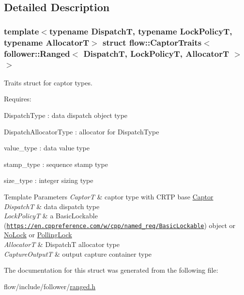 \subsection{Detailed Description}
\subsubsection*{template$<$typename DispatchT, typename Lock\+PolicyT, typename AllocatorT$>$\newline
struct flow\+::\+Captor\+Traits$<$ follower\+::\+Ranged$<$ Dispatch\+T, Lock\+Policy\+T, Allocator\+T $>$ $>$}

Traits struct for captor types. 

Requires\+:
\begin{DoxyItemize}
\item {\ttfamily Dispatch\+Type} \+: data dispatch object type
\item {\ttfamily Dispatch\+Allocator\+Type} \+: allocator for {\ttfamily Dispatch\+Type}
\item {\ttfamily value\+\_\+type} \+: data value type
\item {\ttfamily stamp\+\_\+type} \+: sequence stamp type
\item {\ttfamily size\+\_\+type} \+: integer sizing type
\end{DoxyItemize}


\begin{DoxyTemplParams}{Template Parameters}
{\em CaptorT} & captor type with C\+R\+TP base {\ttfamily \hyperlink{classflow_1_1_captor}{Captor}}\\
\hline
{\em DispatchT} & data dispatch type \\
\hline
{\em Lock\+PolicyT} & a Basic\+Lockable (\href{https://en.cppreference.com/w/cpp/named_req/BasicLockable}{\tt https\+://en.\+cppreference.\+com/w/cpp/named\+\_\+req/\+Basic\+Lockable}) object or \hyperlink{structflow_1_1_no_lock}{No\+Lock} or \hyperlink{structflow_1_1_polling_lock}{Polling\+Lock} \\
\hline
{\em AllocatorT} & {\ttfamily DispatchT} allocator type \\
\hline
{\em Capture\+OutputT} & output capture container type \\
\hline
\end{DoxyTemplParams}


The documentation for this struct was generated from the following file\+:\begin{DoxyCompactItemize}
\item 
flow/include/follower/\hyperlink{ranged_8h}{ranged.\+h}\end{DoxyCompactItemize}
